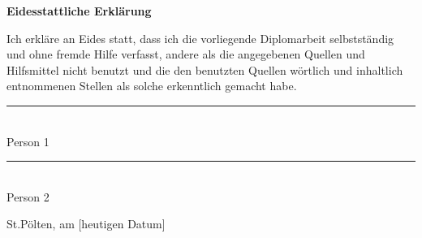 \begin{flushleft}
\Large
\textbf{Eidesstattliche Erklärung\\}
\vspace{1.5cm}
\end{flushleft}


Ich erkläre an Eides statt, dass ich die vorliegende Diplomarbeit selbstständig und ohne fremde Hilfe verfasst, andere als die angegebenen Quellen
und Hilfsmittel nicht benutzt und die den benutzten Quellen wörtlich und inhaltlich entnommenen Stellen als solche erkenntlich gemacht habe.

\begin{center}
	\vspace{1.5cm}
	\rule{200pt}{1pt} \\
	Person 1
	
	\vspace{1.5cm}
	\rule{200pt}{1pt} \\
	Person 2
\end{center}

St.Pölten, am [heutigen Datum]
	
	
